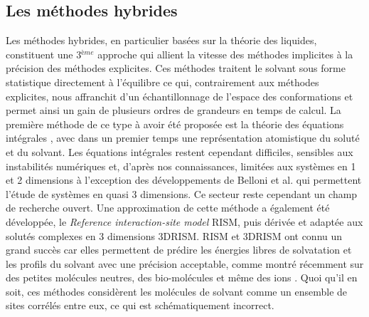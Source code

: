 \subsection{Les méthodes hybrides}
Les méthodes hybrides, en particulier basées sur la théorie des liquides, constituent une 3$^{ème}$ approche qui allient la vitesse des méthodes implicites à la précision des méthodes explicites. Ces méthodes traitent le solvant sous forme statistique directement à l'équilibre ce qui, contrairement aux méthodes explicites, nous affranchit d'un échantillonnage de l'espace des conformations et permet ainsi un gain de plusieurs ordres de grandeurs en temps de calcul. La première méthode de ce type à avoir été proposée est la théorie des équations intégrales \cite{hansen_theory_2006,gray_theory_1984,hirata_molecular_2003}, avec dans un premier temps une représentation atomistique du soluté et du solvant. Les équations intégrales restent cependant difficiles, sensibles aux instabilités numériques et, d'après nos connaissances, limitées aux systèmes en 1 et 2 dimensions à l'exception des développements de Belloni et al.\cite{Puibasset_bridge_2012, belloni_unpublished} qui permettent l'étude de systèmes en quasi 3 dimensions. Ce secteur reste cependant un champ de recherche ouvert. Une approximation de cette méthode a également été développée, le \textit{Reference interaction-site model} RISM\cite{chandler_optimized_1972}, puis dérivée et adaptée aux solutés complexes en 3 dimensions 3DRISM\cite{Chandler_censity_1986,Kovalenko_self_1999,beglov_integral_1997, du_solvation_2000,  luchko_three-dimensional_2010}. RISM et 3DRISM ont connu un grand succès car elles permettent de prédire les énergies libres de solvatation et les profils du solvant avec une précision acceptable, comme montré récemment sur des petites molécules neutres\cite{roy_predicting_2017, du_solvation_2000, kovalenko_potential_1999, kovalenko_hydration_2000, johnson_small_2016}, des bio-molécules \cite{sindhikara_analysis_2013,imai_hydration_2006,kiyota_new_2011,phongphanphanee_molecular_2010} et même des ions \cite{phongphanphanee_potential_2009, kovalenko_potentials_2000}. Quoi qu'il en soit, ces méthodes considèrent les molécules de solvant comme un ensemble de sites corrélés entre eux, ce qui est schématiquement incorrect.


